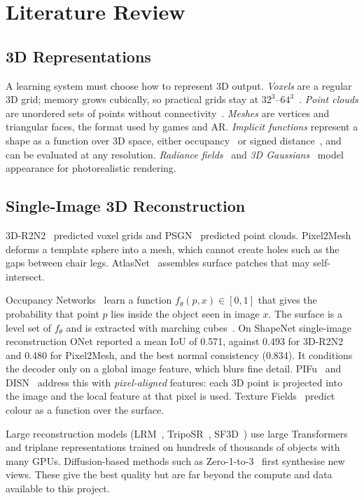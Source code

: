 \chapter{Literature Review}

\section{3D Representations}
A learning system must choose how to represent 3D output. \emph{Voxels} are a regular 3D grid; memory grows cubically, so practical grids stay at $32^3$--$64^3$~\cite{choy2016r2n2}. \emph{Point clouds} are unordered sets of points without connectivity~\cite{fan2017psgn}. \emph{Meshes} are vertices and triangular faces, the format used by games and AR. \emph{Implicit functions} represent a shape as a function over 3D space, either occupancy~\cite{mescheder2019onet} or signed distance~\cite{park2019deepsdf}, and can be evaluated at any resolution. \emph{Radiance fields}~\cite{mildenhall2020nerf} and \emph{3D Gaussians}~\cite{kerbl2023gaussian} model appearance for photorealistic rendering.

\section{Single-Image 3D Reconstruction}
3D-R2N2~\cite{choy2016r2n2} predicted voxel grids and PSGN~\cite{fan2017psgn} predicted point clouds. Pixel2Mesh~\cite{wang2018pixel2mesh} deforms a template sphere into a mesh, which cannot create holes such as the gaps between chair legs. AtlasNet~\cite{groueix2018atlasnet} assembles surface patches that may self-intersect.

Occupancy Networks~\cite{mescheder2019onet} learn a function $f_\theta(p, x) \in [0,1]$ that gives the probability that point $p$ lies inside the object seen in image $x$. The surface is a level set of $f_\theta$ and is extracted with marching cubes~\cite{lorensen1987marching}. On ShapeNet single-image reconstruction ONet reported a mean IoU of 0.571, against 0.493 for 3D-R2N2 and 0.480 for Pixel2Mesh, and the best normal consistency (0.834). It conditions the decoder only on a global image feature, which blurs fine detail. PIFu~\cite{saito2019pifu} and DISN~\cite{xu2019disn} address this with \emph{pixel-aligned} features: each 3D point is projected into the image and the local feature at that pixel is used. Texture Fields~\cite{oechsle2019texturefields} predict colour as a function over the surface.

Large reconstruction models (LRM~\cite{hong2024lrm}, TripoSR~\cite{tochilkin2024triposr}, SF3D~\cite{boss2024sf3d}) use large Transformers and triplane representations trained on hundreds of thousands of objects with many GPUs. Diffusion-based methods such as Zero-1-to-3~\cite{liu2023zero123} first synthesise new views. These give the best quality but are far beyond the compute and data available to this project.

